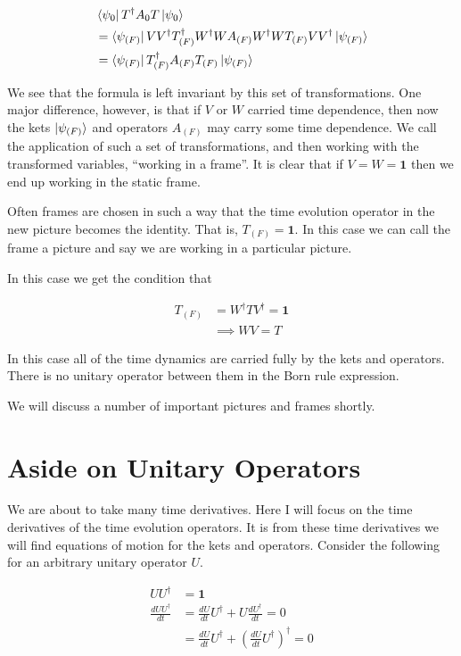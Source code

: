 \documentclass[12pt]{article}
\newcommand{\ddt}[1]{\frac{d #1}{dt}}
\newcommand{\bv}[1]{\boldsymbol{#1}}
\begin{document}
\begin{align}
&\bra{\psi_0} T^{\dag}A_0 T \ket{\psi_0}\\
&= \bra{\psi_{(F)}} V V^{\dag}T_{(F)}^{\dag}W^{\dag} W A_{(F)} W^{\dag} W T_{(F)} V V^{\dag}\ket{\psi_{(F)}}\\
&= \bra{\psi_{(F)}} T_{(F)}^{\dag} A_{(F)} T_{(F)} \ket{\psi_{(F)}}
\end{align}

We see that the formula is left invariant by this set of transformations. One major difference, however, is that if $V$ or $W$ carried time dependence, then now the kets $\ket{\psi_{(F)}}$ and operators $A_{(F)}$ may carry some time dependence. We call the application of such a set of transformations, and then working with the transformed variables, ``working in a frame''. It is clear that if $V=W=\bv{1}$ then we end up working in the static frame.

Often frames are chosen in such a way that the time evolution operator in the new picture becomes the identity. That is, $T_{(F)} = \bv{1}$. In this case we can call the frame a picture and say we are working in a particular picture.

In this case we get the condition that

\begin{align}
T_{(F)} &= W^{\dag}TV^{\dag} = \bv{1}\\
&\implies WV = T
\end{align}

In this case all of the time dynamics are carried fully by the kets and operators. There is no unitary operator between them in the Born rule expression.

We will discuss a number of important pictures and frames shortly.

\section{Aside on Unitary Operators}

We are about to take many time derivatives. Here I will focus on the time derivatives of the time evolution operators. It is from these time derivatives we will find equations of motion for the kets and operators. Consider the following for an arbitrary unitary operator $U$.

\begin{align}
U U^{\dag} &= \bv{1}\\
\ddt{UU^{\dag}} &= \ddt{U}U^{\dag} + U \ddt{U^{\dag}} = 0\\
&= \ddt{U} U^{\dag} + \left(\ddt{U} U^{\dag}\right)^{\dag} = 0
\end{align}
\end{document}

